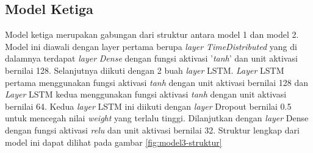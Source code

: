 \subsection{Model Ketiga}
\label{sec:analisismodel3}

Model ketiga merupakan gabungan dari struktur antara model 1 dan model 2. Model ini diawali dengan layer pertama berupa \emph{layer} \textit{TimeDistributed} yang di dalamnya terdapat \emph{layer} \textit{Dense} dengan fungsi aktivasi '\textit{tanh}' dan unit aktivasi bernilai 128. Selanjutnya diikuti dengan 2 buah \emph{layer} LSTM. \emph{Layer} LSTM pertama menggunakan fungsi aktivasi \emph{tanh} dengan unit aktivasi bernilai 128 dan \emph{Layer} LSTM kedua menggunakan fungsi aktivasi \emph{tanh} dengan unit aktivasi bernilai 64. Kedua \emph{layer} LSTM ini diikuti dengan \emph{layer} Dropout bernilai 0.5 untuk mencegah nilai \emph{weight} yang terlalu tinggi. Dilanjutkan dengan \emph{layer} Dense dengan fungsi aktivasi \emph{relu} dan unit aktivasi bernilai 32. Struktur lengkap dari model ini dapat dilihat pada gambar \ref{fig:model3-struktur}

